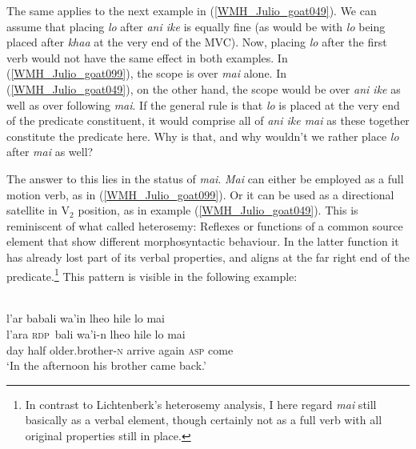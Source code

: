 The same applies to the next example in (\ref{WMH_Julio_goat049}). We can assume that placing \textit{lo} after \textit{ani ike} is equally fine (as would be with \textit{lo} being placed after \textit{khaa} at the very end of the MVC). Now, placing \textit{lo} after the first verb would not have the same effect in both examples. In (\ref{WMH_Julio_goat099}), the scope is over \textit{mai} alone. In (\ref{WMH_Julio_goat049}), on the other hand, the scope would be over \textit{ani ike} as well as over following \textit{mai}. If the general rule is that \textit{lo} is placed at the very end of the predicate constituent, it would comprise all of \textit{ani ike mai} as these together constitute the predicate here. Why is that, and why wouldn't we rather place \textit{lo} after \textit{mai} as well?

The answer to this lies in the status of \textit{mai}. \textit{Mai} can either be employed as a full motion verb, as in (\ref{WMH_Julio_goat099}). Or it can be used as a directional satellite in V$_2$ position, as in example (\ref{WMH_Julio_goat049}). This is reminiscent of what \citet{lichtenberk1991semantic} called heterosemy: Reflexes or functions of a common source element that show different morphosyntactic behaviour. In the latter function it has already lost part of its verbal properties, and aligns at the far right end of the predicate.\footnote{In contrast to Lichtenberk's heterosemy analysis, I here regard  \textit{mai} still basically as a verbal element, though certainly not as a full verb with all original properties still in place.} This pattern is visible in the following example:
 
\ea
{}\\
\glll l'ar babali wa'in lheo hile lo mai \\
l'ara \textsc{rdp}~bali wa'i-n lheo hile lo mai \\
day half older.brother-\textsc{n} arrive again \textsc{asp} come\\
\glft `In the afternoon his brother came back.'\\
\z

